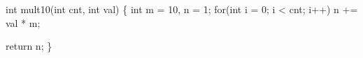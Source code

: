 \begin{minipage}{3in}
\begin{AVerb}[gobble=2,numbers=left]
  int mult10(int cnt, int val) \{ 
    int m = 10, n = 1; \label{fig_back7_m}
    for(int i = 0; i < cnt; i++) \label{fig_back7_test}
      n += val * m; \label{fig_back7_loop}

    return n;
  \}
\end{AVerb}
\end{minipage}
